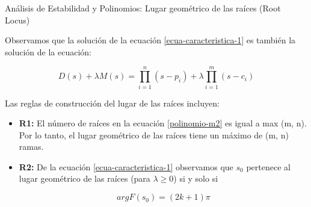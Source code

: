 \documentclass{beamer}
\begin{document}
\begin{frame}{Análisis de Estabilidad y Polinomios: Lugar geométrico de las raíces (Root Locus)}
\begin{justify}
Observamos que la solución de la ecuación \ref{ecua-caracteristica-1} es también la solución de la ecuación:

{\footnotesize
\begin{equation}\label{polinomio-m2}
    D(s) + \lambda M(s) = \prod_{i=1}^{n} (s-p_i) + \lambda\prod_{i=1}^{m} (s-c_i)
\end{equation}
}

\vspace{0.3cm}
Las reglas de construcción del lugar de las raíces incluyen:

\vspace{0.2cm}
\begin{itemize}
    \item \textbf {R1:} El número de raíces en la ecuación \ref{polinomio-m2} es igual a max (m, n). Por lo tanto, el lugar geométrico de las raíces tiene un máximo de (m, n) ramas.

    \vspace{0.3cm}
    \item \textbf {R2:} De la ecuación \ref{ecua-caracteristica-1} observamos que $s_0$ pertenece al lugar geométrico de las raíces (para $\lambda \geq 0$) si y solo si

    {\footnotesize
    \begin{equation}\label{regla-2}
        argF(s_0) = (2k+1)\pi
    \end{equation}
    }

    
\end{itemize}

\end{justify}
\end{frame}
\end{document}
